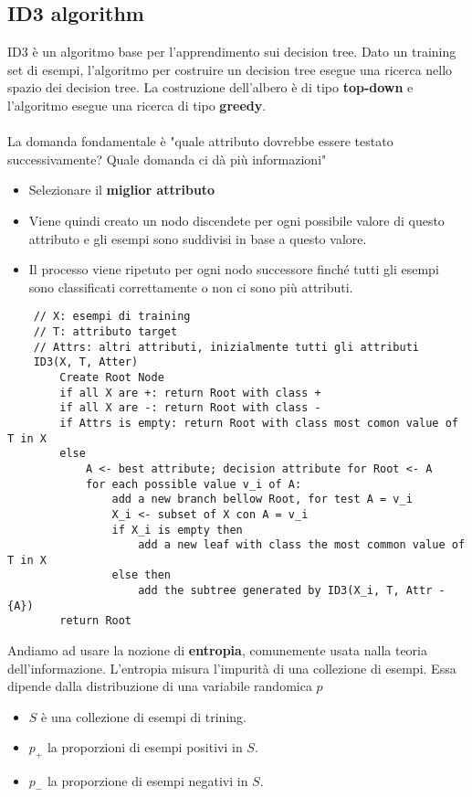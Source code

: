 \subsection{ID3 algorithm}
ID3 è un algoritmo base per l'apprendimento sui decision tree. Dato un training set di esempi, l'algoritmo per costruire
un decision tree esegue una ricerca nello spazio dei decision tree. La costruzione dell'albero è di tipo \textbf{top-down} e l'algoritmo
esegue una ricerca di tipo \textbf{greedy}.\\\\
La domanda fondamentale è "quale attributo dovrebbe essere testato successivamente? Quale domanda ci dà più informazioni"
\begin{itemize}
    \item Selezionare il \textbf{miglior attributo}
    \item Viene quindi creato un nodo discendete per ogni possibile valore di questo attributo e gli esempi sono suddivisi in base a questo valore.
    \item Il processo viene ripetuto per ogni nodo successore finché tutti gli esempi sono classificati correttamente o non ci sono più attributi.
\end{itemize}
\begin{lstlisting}
    // X: esempi di training
    // T: attributo target
    // Attrs: altri attributi, inizialmente tutti gli attributi
    ID3(X, T, Atter) 
        Create Root Node
        if all X are +: return Root with class +
        if all X are -: return Root with class -
        if Attrs is empty: return Root with class most comon value of T in X
        else 
            A <- best attribute; decision attribute for Root <- A
            for each possible value v_i of A:
                add a new branch bellow Root, for test A = v_i
                X_i <- subset of X con A = v_i
                if X_i is empty then 
                    add a new leaf with class the most common value of T in X
                else then
                    add the subtree generated by ID3(X_i, T, Attr - {A})
        return Root
\end{lstlisting}
Andiamo ad usare la nozione di \textbf{entropia}, comunemente usata nalla teoria dell'informazione.
L'entropia misura l'impurità di una collezione di esempi. Essa dipende dalla distribuzione di una variabile randomica $p$
\begin{itemize}
    \item $S$ è una collezione di esempi di trining.
    \item $p_+$ la proporzioni di esempi positivi in $S$.
    \item $p_-$ la proporzione di esempi negativi in $S$.
\end{itemize}
